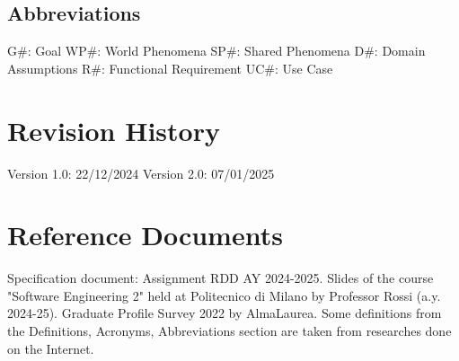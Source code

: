 \subsection{Abbreviations}
G\#: Goal\newline
WP\#: World Phenomena\newline
SP\#: Shared Phenomena\newline
D\#: Domain Assumptions\newline
R\#: Functional Requirement\newline
UC\#: Use Case

\section{Revision History}
Version 1.0: 22/12/2024
Version 2.0: 07/01/2025

\section{Reference Documents}
Specification document: Assignment RDD AY 2024-2025. \newline
Slides of the course "Software Engineering 2" held at Politecnico di Milano by Professor Rossi (a.y. 2024-25).\newline
Graduate Profile Survey 2022 by AlmaLaurea.\newline
Some definitions from the Definitions, Acronyms, Abbreviations section are taken from researches done on the Internet.\newline

